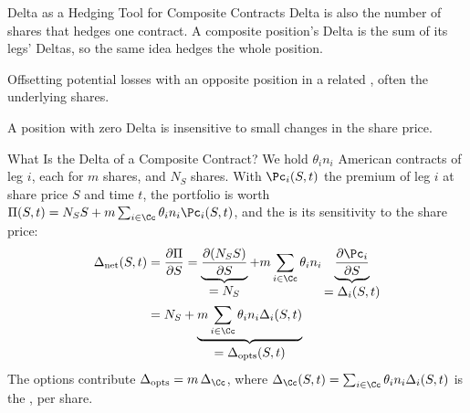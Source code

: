 \begin{frame}{Delta as a Hedging Tool for Composite Contracts}
  Delta is also the number of shares that hedges one contract. A composite
  position's Delta is the sum of its legs' Deltas, so the same idea hedges the
  whole position.

  \vspace{0.6em}
  \textbf{} Offsetting potential losses with an opposite
  position in a related , often the underlying shares.

  \vspace{0.6em}
  A position with zero Delta is insensitive to small changes in the share price.
\end{frame}

\begin{frame}{What Is the Delta of a Composite Contract?}
  We hold $\theta_{i}n_{i}$ American contracts of leg $i$, each for $m$ shares,
  and $N_{S}$ shares. With $\Pc_{i}(S,t)$ the premium of leg $i$ at share price
  $S$ and time $t$, the portfolio is worth
  $\Pi(S,t)=N_{S}S+m\sum_{i\in\Cc}\theta_{i}n_{i}\Pc_{i}(S,t)$, and the
   is its sensitivity to the share price:
  \begin{align*}
    \Delta_{\text{net}}(S,t)&=\frac{\partial \Pi}{\partial S}
    = \underbrace{\frac{\partial (N_{S} S)}{\partial S}}_{\textstyle=N_{S}} + m\sum_{i\in\Cc} \theta_{i} n_{i} \underbrace{\frac{\partial \Pc_{i}}{\partial S}}_{\textstyle=\Delta_{i}(S,t)}\\
    &= N_{S} + \underbrace{m\sum_{i\in\Cc} \theta_{i} n_{i} \Delta_{i}(S,t)}_{\textstyle= \Delta_{\text{opts}}(S,t)}
  \end{align*}
  The options contribute $\Delta_{\text{opts}}=m\,\Delta_{\Cc}$, where
  $\Delta_{\Cc}(S,t)=\sum_{i\in\Cc}\theta_{i}n_{i}\Delta_{i}(S,t)$ is the , per share.
\end{frame}

